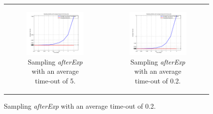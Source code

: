 \begin{figure}
\begin{center}
	\begin{tabular}{c c}
		\begin{subfigure}[b]{0.5\textwidth}
			\centering
			\includegraphics[width=.6\textwidth, angle=0]{./../shared/fig/samplingTest_afterExp_5time.png}
			\caption{Sampling \textit{afterExp} with an average time-out of 5.}
			\label{fig:sampling_afterExp_5time}
		\end{subfigure}

		& 

		\begin{subfigure}[b]{0.5\textwidth}
			\centering
			\includegraphics[width=.6\textwidth, angle=0]{./../shared/fig/samplingTest_afterExp_02time.png}
			\caption{Sampling \textit{afterExp} with an average time-out of 0.2.}
			\label{fig:sampling_afterExp_02time}
		\end{subfigure}

		\\ 
		

\end{tabular}
\end{center}
\end{figure}
